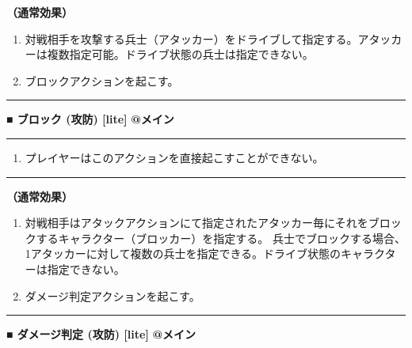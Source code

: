 \documentclass[twocolumn,a5paper,papersize,10pt]{jarticle}
\begin{document}
{\bf（通常効果）}


\vspace{-1zh}%
\begin{enumerate}
\setlength{\leftskip}{-0.3cm}
\setlength{\parskip}{0pt} %

\item 対戦相手を攻撃する兵士（アタッカー）をドライブして指定する。アタッカーは複数指定可能。ドライブ状態の兵士は指定できない。

\item ブロックアクションを起こす。
\vspace{-1zh}%
\end{enumerate}
\vspace{2mm} %
\hrule height 0.5mm depth 0mm width 66.5mm %
\vspace{1mm} %
{\small\bf ■ ブロック {\scriptsize (攻防) [lite]}} %
\hfill 
{\footnotesize\bf @メイン }


\vspace{1mm}%
\hrule height 0.1mm depth 0mm width 66.5mm %
\vspace{1mm}%


\vspace{-1zh}%
\begin{enumerate}
\renewcommand{\labelenumi}{※}
\setlength{\leftskip}{-0.3cm}
\setlength{\itemsep}{0pt} %
\setlength{\parskip}{0pt} %

\item プレイヤーはこのアクションを直接起こすことができない。

\vspace{-3mm}%
\end{enumerate}
\vspace{1mm}%
\hrule height 0.1mm depth 0mm width 66.5mm %
\vspace{1mm}%

{\bf（通常効果）}


\vspace{-1zh}%
\begin{enumerate}
\setlength{\leftskip}{-0.3cm}
\setlength{\parskip}{0pt} %

\item 対戦相手はアタックアクションにて指定されたアタッカー毎にそれをブロックするキャラクター（ブロッカー）を指定する。 兵士でブロックする場合、1アタッカーに対して複数の兵士を指定できる。ドライブ状態のキャラクターは指定できない。

\item ダメージ判定アクションを起こす。
\vspace{-1zh}%
\end{enumerate}
\vspace{2mm} %
\hrule height 0.5mm depth 0mm width 66.5mm %
\vspace{1mm} %
{\small\bf ■ ダメージ判定 {\scriptsize (攻防) [lite]}} %
\hfill 
{\footnotesize\bf @メイン }
\end{document}
